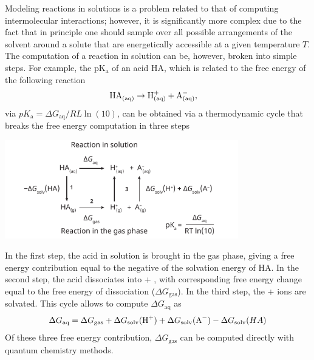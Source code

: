 \documentclass[../Main/notes.tex]{subfiles}
\begin{document}
Modeling reactions in solutions is a problem related to that of computing intermolecular interactions; however, it is significantly more complex due to the fact that in principle one should sample over all possible arrangements of the solvent around a solute that are energetically accessible at a given temperature $T$.
The computation of a reaction in solution can be, however, broken into simple steps.
For example, the pK$_\mathrm{a}$ of an acid HA, which is related to the free energy of the following reaction 
\begin{equation}
\ce{HA_{(aq)}} \rightarrow \ce{H^+_{(aq)}} + \ce{A^-_{(aq)}}, \quad 
\end{equation}
via $pK_\mathrm{a} = \Delta G_\textrm{aq} / RL \ln(10)$, can be obtained via a thermodynamic cycle  that breaks the free energy computation in three steps
\begin{center}
\includegraphics[width=4.0in]{img/solvent.pdf}
\end{center}
In the first step, the acid in solution is brought in the gas phase, giving a free energy contribution equal to the negative of the solvation energy of HA.
In the second step, the acid dissociates into  + , with corresponding free energy change equal to the free energy of dissociation ($\Delta G_\textrm{gas}$).
In the third step, the  +  ions are solvated.
This cycle allows to compute $\Delta G_\textrm{aq}$ as
\begin{equation}
\Delta G_\textrm{aq} = \Delta G_\textrm{gas} + \Delta G_\textrm{solv}(\ce{H^+}) + \Delta G_\textrm{solv}(\ce{A^-})  -\Delta G_\textrm{solv}(HA)
\end{equation}
Of these three free energy contribution, $\Delta G_\textrm{gas}$ can be computed directly with quantum chemistry methods.
\end{document}
